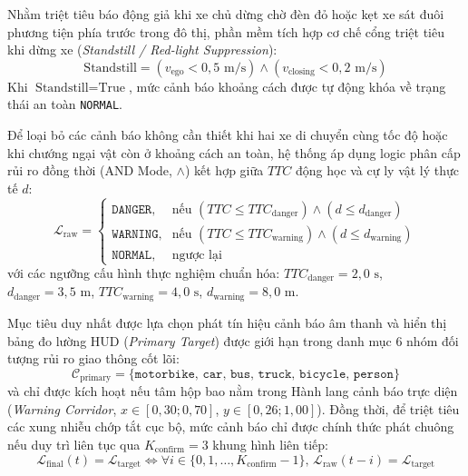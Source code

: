 \documentclass[12pt,a4paper]{article}
\begin{document}
Nhằm triệt tiêu báo động giả khi xe chủ dừng chờ đèn đỏ hoặc kẹt xe sát đuôi phương tiện phía trước trong đô thị, phần mềm tích hợp cơ chế cổng triệt tiêu khi dừng xe (\textit{Standstill / Red-light Suppression}):
\begin{equation}
\label{eq:standstill_suppression}
\text{Standstill} = (v_{\text{ego}} < 0,5\text{ m/s}) \land (v_{\text{closing}} < 0,2\text{ m/s})
\end{equation}
Khi $\text{Standstill} = \text{True}$, mức cảnh báo khoảng cách được tự động khóa về trạng thái an toàn \texttt{NORMAL}.

Để loại bỏ các cảnh báo không cần thiết khi hai xe di chuyển cùng tốc độ hoặc khi chướng ngại vật còn ở khoảng cách an toàn, hệ thống áp dụng logic phân cấp rủi ro đồng thời (AND Mode, $\land$) kết hợp giữa $TTC$ động học và cự ly vật lý thực tế $d$:
\begin{equation}
\label{eq:and_risk_logic}
\mathcal{L}_{\text{raw}} = \begin{cases}
\texttt{DANGER}, & \text{nếu } (TTC \le TTC_{\text{danger}}) \land (d \le d_{\text{danger}}) \\
\texttt{WARNING}, & \text{nếu } (TTC \le TTC_{\text{warning}}) \land (d \le d_{\text{warning}}) \\
\texttt{NORMAL}, & \text{ngược lại}
\end{cases}
\end{equation}
với các ngưỡng cấu hình thực nghiệm chuẩn hóa: $TTC_{\text{danger}} = 2,0\text{ s}$, $d_{\text{danger}} = 3,5\text{ m}$, $TTC_{\text{warning}} = 4,0\text{ s}$, $d_{\text{warning}} = 8,0\text{ m}$.

Mục tiêu duy nhất được lựa chọn phát tín hiệu cảnh báo âm thanh và hiển thị bảng đo lường HUD (\textit{Primary Target}) được giới hạn trong danh mục 6 nhóm đối tượng rủi ro giao thông cốt lõi:
\begin{equation}
\label{eq:primary_classes}
\mathcal{C}_{\text{primary}} = \{\texttt{motorbike, car, bus, truck, bicycle, person}\}
\end{equation}
và chỉ được kích hoạt nếu tâm hộp bao nằm trong Hành lang cảnh báo trực diện (\textit{Warning Corridor}, $x \in [0,30; 0,70]$, $y \in [0,26; 1,00]$). Đồng thời, để triệt tiêu các xung nhiễu chớp tắt cục bộ, mức cảnh báo chỉ được chính thức phát chuông nếu duy trì liên tục qua $K_{\text{confirm}} = 3$ khung hình liên tiếp:
\begin{equation}
\label{eq:confirm_frames}
\mathcal{L}_{\text{final}}(t) = \mathcal{L}_{\text{target}} \iff \forall i \in \{0, 1, \dots, K_{\text{confirm}} - 1\}, \, \mathcal{L}_{\text{raw}}(t - i) = \mathcal{L}_{\text{target}}
\end{equation}
\end{document}
